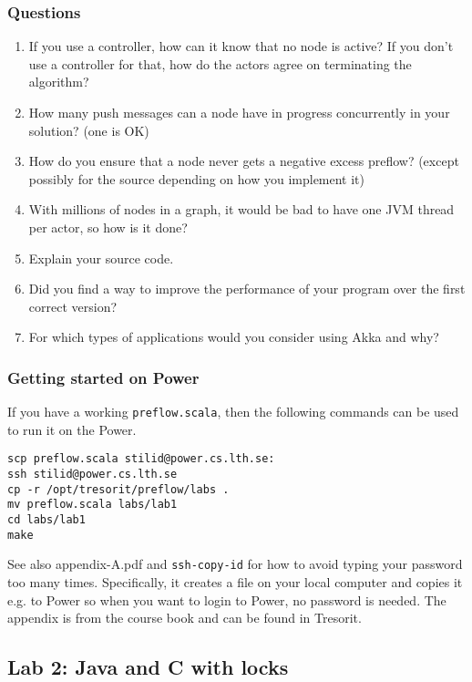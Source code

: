 \documentclass{forsete}
\begin{document}
\subsubsection*{Questions}
\begin{enumerate}
\item If you use a controller, how can it know that no node is active? If you don't use a controller for that, how do the actors agree on
terminating the algorithm?
\item How many push messages can a node have in progress concurrently in your solution? (one is OK)
\item How do you ensure that a node never gets a negative excess preflow? (except possibly for the source depending on how you implement it)
\item With millions of nodes in a graph, it would be bad to have one JVM thread per actor, so how is it done?
\item Explain your source code.
\item Did you find a way to improve the performance of your program over the first correct version?
\item For which types of applications would you consider using Akka and why?
\end{enumerate}

\subsubsection*{Getting started on Power}
If you have a working \verb!preflow.scala!, then the following commands can be used to run it on the Power.
\begin{verbatim}
scp preflow.scala stilid@power.cs.lth.se:
ssh stilid@power.cs.lth.se
cp -r /opt/tresorit/preflow/labs .
mv preflow.scala labs/lab1
cd labs/lab1
make
\end{verbatim}

See also appendix-A.pdf and \verb!ssh-copy-id! for how to avoid typing your password too many times. Specifically, it creates a file on your local computer and copies it e.g. to Power so when you want to login to Power, no password is needed. The appendix is from the course book and can be found in Tresorit.


\newpage
\subsection*{Lab 2: Java and C with locks}
\end{document}
